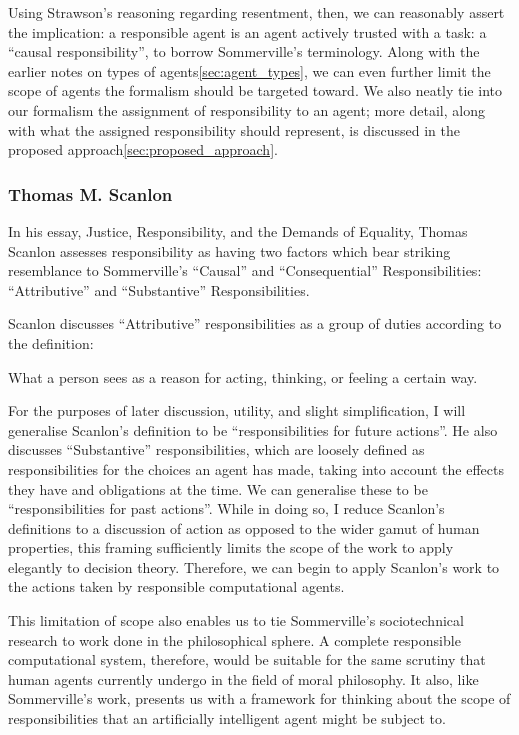 Using Strawson's reasoning regarding resentment, then, we can reasonably assert the implication: a responsible agent is an agent actively trusted with a task: a ``causal responsibility'', to borrow Sommerville's terminology. Along with the earlier notes on types of agents\cref{sec:agent_types}, we can even further limit the scope of agents the formalism should be targeted toward. We also neatly tie into our formalism the assignment of responsibility to an agent; more detail, along with what the assigned responsibility should represent, is discussed in the proposed approach\cref{sec:proposed_approach}.\par

\subsubsection{Thomas M. Scanlon}
In his essay, Justice, Responsibility, and the Demands of Equality\cite{scanlon2006justice}, Thomas Scanlon assesses responsibility as having two factors which bear striking resemblance to Sommerville's ``Causal'' and ``Consequential'' Responsibilities: ``Attributive'' and ``Substantive'' Responsibilities.\par

Scanlon discusses ``Attributive'' responsibilities as a group of duties according to the definition:
\begin{displayquote}
    What a person sees as a reason for acting, thinking, or feeling a certain way.
\end{displayquote}\par

For the purposes of later discussion, utility, and slight simplification, I will generalise Scanlon's definition to be ``responsibilities for future actions''. He also discusses ``Substantive'' responsibilities, which are loosely defined as responsibilities for the choices an agent has made, taking into account the effects they have and obligations at the time. We can generalise these to be ``responsibilities for past actions''. While in doing so, I reduce Scanlon's definitions to a discussion of action as opposed to the wider gamut of human properties, this framing sufficiently limits the scope of the work to apply elegantly to decision theory. Therefore, we can begin to apply Scanlon's work to the actions taken by responsible computational agents.\par

This limitation of scope also enables us to tie Sommerville's sociotechnical research to work done in the philosophical sphere. A complete responsible computational system, therefore, would be suitable for the same scrutiny that human agents currently undergo in the field of moral philosophy. It also, like Sommerville's work, presents us with a framework for thinking about the scope of responsibilities that an artificially intelligent agent might be subject to.\par

